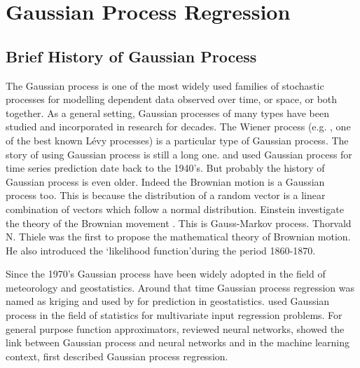 
\chapter{Gaussian Process Regression} \label{ch:GaussianProcessRegression}

\ifpdf
    \graphicspath{{Chapter3/Figs/Raster/}{Chapter3/Figs/PDF/}{Chapter3/Figs/}}
\else
    \graphicspath{{Chapter3/Figs/Vector/}{Chapter3/Figs/}}
\fi

\section{Brief History of Gaussian Process}
The Gaussian process is one of the most widely used families of stochastic processes for modelling dependent data observed over time, or space, or both together. As a general setting, Gaussian processes of many types have been studied and incorporated in research for decades. The Wiener process (e.g. \cite{Papoulis:1991}, one of the best known L\'{e}vy processes) is a particular type of Gaussian process. The story of using Gaussian process is still a long one. \cite{Kolmogorov:1941} and \cite{Wiener:1949} used Gaussian process for time series prediction date back to the 1940's. But probably the history of Gaussian process is even older. Indeed the Brownian motion is a Gaussian process too. This is because the distribution of a random vector is a linear combination of vectors which follow a normal distribution. Einstein investigate the theory of the Brownian movement \cite{Einstein:1926}. This is Gauss-Markov process. Thorvald N. Thiele was the first to propose the mathematical theory of Brownian motion. He also introduced the \lq likelihood function\rq during the period 1860-1870.

Since the 1970's Gaussian process have been widely adopted in the field of meteorology and geostatistics. Around that time Gaussian process regression was named as kriging and used by \cite{Matheron:1973} for prediction in geostatistics. \cite{O'Hagan:1978} used Gaussian process in the field of statistics for multivariate input regression problems. For general purpose function approximators, \cite{Bishop:1995} reviewed neural networks, \cite{Neal:1996} showed the link between Gaussian process and neural networks and in the machine learning context, \cite{Williams_and_Rasmussen:1996} first described Gaussian process regression. 

